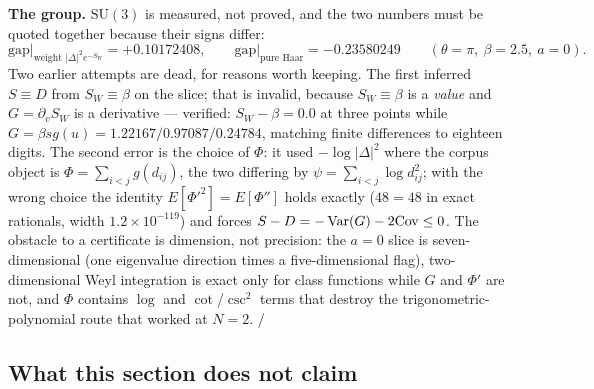 \noindent
\textbf{The group.} $\mathrm{SU}(3)$ is measured, not proved, and the two numbers must be quoted
together because their signs differ:
\begin{equation}
\mathrm{gap}\big|_{\text{weight }|\Delta|^{2}e^{-S_{W}}}=+0.10172408,\qquad
\mathrm{gap}\big|_{\text{pure Haar}}=-0.23580249
\qquad(\theta=\pi,\ \beta=2.5,\ a=0).
\label{eq:su3gap}
\end{equation}
Two earlier attempts are dead, for reasons worth keeping. The first inferred $S\equiv D$ from
$S_{W}\equiv\beta$ on the slice; that is invalid, because $S_{W}\equiv\beta$ is a \emph{value} and
$G=\partial_{v}S_{W}$ is a derivative --- verified: $S_{W}-\beta=0.0$ at three points while
$G=\beta sg(u)=1.22167/0.97087/0.24784$, matching finite differences to eighteen digits. The second
error is the choice of $\Phi$: it used $-\log|\Delta|^{2}$ where the corpus object is
$\Phi=\sum_{i<j}g(d_{ij})$, the two differing by $\psi=\sum_{i<j}\log d_{ij}^{2}$; with the wrong choice
the identity $E[\Phi'^{2}]=E[\Phi'']$ holds exactly ($48=48$ in exact rationals, width
$1.2\times10^{-119}$) and forces $S-D=-\operatorname{Var}(G)-2\mathrm{Cov}\le0$. The obstacle to a certificate is
dimension, not precision: the $a=0$ slice is seven-dimensional (one eigenvalue direction times a
five-dimensional flag), two-dimensional Weyl integration is exact only for class functions while $G$
and $\Phi'$ are not, and $\Phi$ contains $\log$ and $\cot$/$\csc^{2}$ terms that destroy the
trigonometric-polynomial route that worked at $N=2$. \LE{}/~\LM
{}

\subsection{What this section does not claim}

